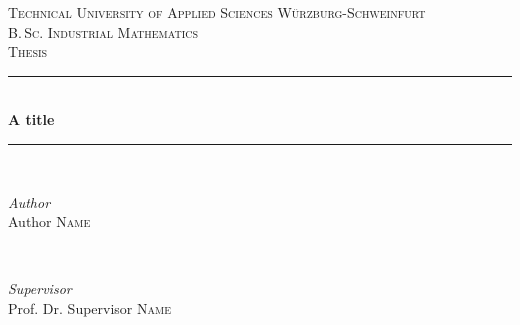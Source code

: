 \begin{titlepage} %
    \newcommand{\HRule}{{\color{mpl-blue}\rule{\linewidth}{0.5mm}}} %

    \center %


    \textsc{\LARGE Technical University of Applied Sciences Würzburg-Schweinfurt}\\[1.5cm] %

    \textsc{\Large B.\,Sc. Industrial Mathematics}\\[0.5cm] %

    \textsc{\large Thesis}\\[0.5cm] %


    \HRule\\[0.4cm]

    {\huge\bfseries A title}\\[0.4cm] %

    \HRule\\[1.5cm]


    \begin{minipage}{0.4\textwidth}
        \begin{flushleft}
            \large
            \textit{Author}\\
            Author \textsc{Name} %
        \end{flushleft}
    \end{minipage}
    ~
    \begin{minipage}{0.5\textwidth}
        \begin{flushright}
            \large
            \textit{Supervisor}\\
            Prof. Dr. Supervisor \textsc{Name} %
            \\
        \end{flushright}
    \end{minipage}


\end{titlepage}
